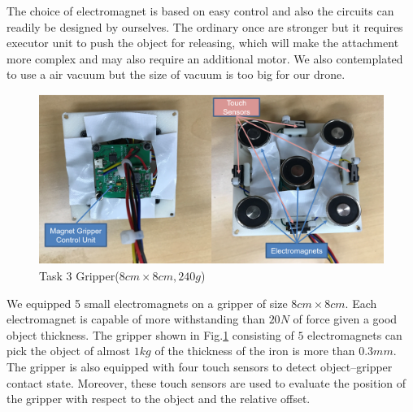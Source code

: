 \documentclass{standalone}
\begin{document}
The choice of electromagnet is based on easy control and also the circuits
can readily be designed by ourselves. The ordinary once are stronger but it
requires executor unit to push the object for releasing, which will
make the attachment more complex and may also require an additional motor. We
also contemplated to use a air vacuum but the size of vacuum is too
big for our drone.

 \begin{figure}[hb]
    \begin{center}
    \includegraphics[keepaspectratio=true, width=1\linewidth, height=0.3\textheight]
    {sections//task3//images//task3gripper.png}
      \end{center}
    \caption{Task 3 Gripper($8cm \times 8cm, 240g$)}
    \label{task3platform}
    \end{figure}

We equipped 5 small electromagnets on a gripper of size $8cm \times
8cm$. Each electromagnet is capable of more withstanding than $20 N$
of force given a good object thickness. The gripper shown in
Fig.\ref{task3platform} consisting of $5$
electromagnets can pick the object of almost $1kg$ of the thickness of
the iron is more than $0.3mm$.
The gripper is also equipped with four touch sensors to detect
object--gripper contact state. Moreover,
these touch sensors are used to evaluate the position of the gripper
with respect to the object and the relative offset. 

\end{document}
